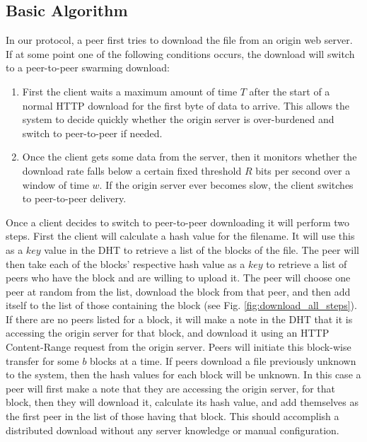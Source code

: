 \subsection{Basic Algorithm}

In our protocol, a peer first tries to download the file from an origin web server.  If at some point one of the following conditions occurs, the download will switch to a peer-to-peer swarming download:
\begin{enumerate}
\item First the client waits a maximum amount of time $T$ after the start of a normal HTTP download for the first byte of data to arrive.  This allows the system to decide quickly whether the origin server is over-burdened and switch to peer-to-peer if needed.   
\item Once the client gets some data from the server, then it monitors whether the download rate falls below a certain fixed threshold $R$ bits per second over a window of time $w$.  If the origin server ever becomes slow, the client switches to peer-to-peer delivery.
\end{enumerate}

Once a client decides to switch to peer-to-peer downloading it will perform two steps.  First the client will calculate a hash value for the filename.  It will use this as a $key$ value in the DHT to retrieve a list of the blocks of the file.  The peer will then take each of the blocks' respective hash value as a $key$ to retrieve a list of peers who have the block and are willing to upload it.  The peer will choose one peer at random from the list, download the block from that peer, and then add itself to the list of those containing the block (see Fig. \ref{fig:download_all_steps}).  If there are no peers listed for a block, it will make a note in the DHT that it is accessing the origin server for that block, and download it using an HTTP Content-Range request from the origin server.  Peers will initiate this block-wise transfer for some $b$ blocks at a time.  If peers download a file previously unknown to the system, then the hash values for each block will be unknown.  In this case a peer will first make a note that they are accessing the origin server, for that block, then they will download it, calculate its hash value, and add themselves as the first peer in the list of those having that block.  This should accomplish a distributed download without any server knowledge or manual configuration.

